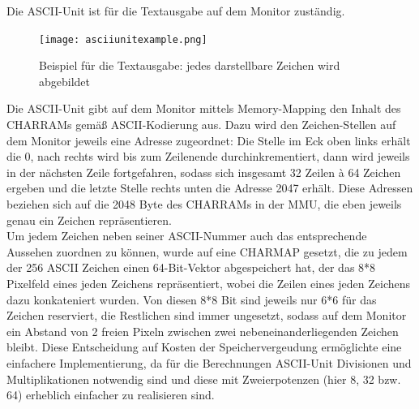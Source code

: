 
\label{ch:asciiunit}
Die ASCII-Unit ist f\"ur die Textausgabe auf dem Monitor zust\"andig.

\begin{figure}[!htbp]
	\centering
	\texttt{[image: asciiunitexample.png]}
	\caption[Beispiel f\"ur die Textausgabe]{Beispiel f\"ur die Textausgabe: jedes darstellbare Zeichen wird abgebildet}
	\label{fig:exampletext}
\end{figure}


Die ASCII-Unit gibt auf dem Monitor mittels Memory-Mapping den Inhalt des CHARRAMs gem{\"a}{\ss} ASCII-Kodierung aus. Dazu wird den Zeichen-Stellen auf dem Monitor jeweils eine Adresse zugeordnet: Die Stelle im Eck oben links erh\"alt die 0, nach rechts wird bis zum Zeilenende durchinkrementiert, dann wird jeweils in der n\"achsten Zeile fortgefahren, sodass sich insgesamt 32 Zeilen \`a 64 Zeichen ergeben und die letzte Stelle rechts unten die Adresse 2047 erh\"alt. Diese Adressen beziehen sich auf die 2048 Byte des CHARRAMs in der MMU, die eben jeweils genau ein Zeichen repr\"asentieren.\\
Um jedem Zeichen neben seiner ASCII-Nummer auch das entsprechende Aussehen zuordnen zu k\"onnen, wurde auf eine CHARMAP gesetzt, die zu jedem der 256 ASCII Zeichen einen 64-Bit-Vektor abgespeichert hat, der das 8*8 Pixelfeld eines jeden Zeichens repr\"asentiert, wobei die Zeilen eines jeden Zeichens dazu konkateniert wurden. Von diesen 8*8 Bit sind jeweils nur 6*6 f\"ur das Zeichen reserviert, die Restlichen sind immer ungesetzt, sodass auf dem Monitor ein Abstand von 2 freien Pixeln zwischen zwei nebeneinanderliegenden Zeichen bleibt. Diese Entscheidung auf Kosten der Speichervergeudung erm\"oglichte eine einfachere Implementierung, da f\"ur die Berechnungen ASCII-Unit Divisionen und Multiplikationen notwendig sind und diese mit Zweierpotenzen (hier 8, 32 bzw. 64) erheblich einfacher zu realisieren sind.

